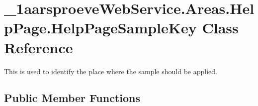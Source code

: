 \hypertarget{class__1aarsproeve_web_service_1_1_areas_1_1_help_page_1_1_help_page_sample_key}{}\section{\+\_\+1aarsproeve\+Web\+Service.\+Areas.\+Help\+Page.\+Help\+Page\+Sample\+Key Class Reference}
\label{class__1aarsproeve_web_service_1_1_areas_1_1_help_page_1_1_help_page_sample_key}


This is used to identify the place where the sample should be applied.  


\subsection*{Public Member Functions}
